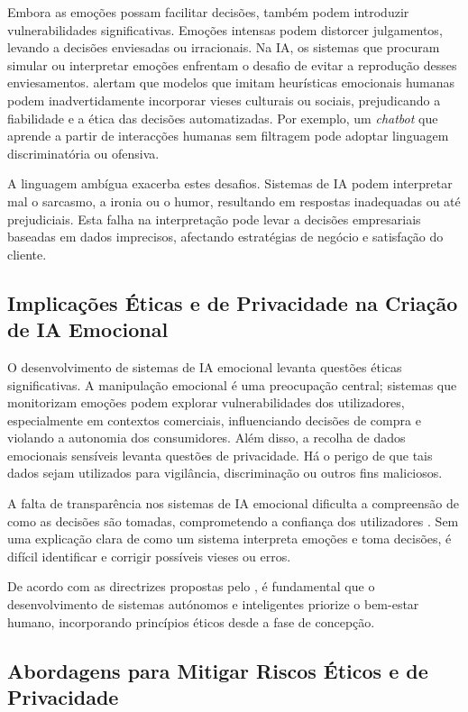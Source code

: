 \documentclass[a4paper,12pt]{report}
\begin{document}
	Embora as emoções possam facilitar decisões, também podem introduzir vulnerabilidades significativas. Emoções intensas podem distorcer julgamentos, levando a decisões enviesadas ou irracionais. Na IA, os sistemas que procuram simular ou interpretar emoções enfrentam o desafio de evitar a reprodução desses enviesamentos. \textcite{russell2020} alertam que modelos que imitam heurísticas emocionais humanas podem inadvertidamente incorporar vieses culturais ou sociais, prejudicando a fiabilidade e a ética das decisões automatizadas. Por exemplo, um \textit{chatbot} que aprende a partir de interacções humanas sem filtragem pode adoptar linguagem discriminatória ou ofensiva.
	
	A linguagem ambígua exacerba estes desafios. Sistemas de IA podem interpretar mal o sarcasmo, a ironia ou o humor, resultando em respostas inadequadas ou até prejudiciais. Esta falha na interpretação pode levar a decisões empresariais baseadas em dados imprecisos, afectando estratégias de negócio e satisfação do cliente.
	
	\subsection{Implicações Éticas e de Privacidade na Criação de IA Emocional}
	
	O desenvolvimento de sistemas de IA emocional levanta questões éticas significativas. A manipulação emocional é uma preocupação central; sistemas que monitorizam emoções podem explorar vulnerabilidades dos utilizadores, especialmente em contextos comerciais, influenciando decisões de compra e violando a autonomia dos consumidores. Além disso, a recolha de dados emocionais sensíveis levanta questões de privacidade. Há o perigo de que tais dados sejam utilizados para vigilância, discriminação ou outros fins maliciosos.
	
	A falta de transparência nos sistemas de IA emocional dificulta a compreensão de como as decisões são tomadas, comprometendo a confiança dos utilizadores \parencite{russell2020}. Sem uma explicação clara de como um sistema interpreta emoções e toma decisões, é difícil identificar e corrigir possíveis vieses ou erros.
	
	De acordo com as directrizes propostas pelo \textcite{ieee2019}, é fundamental que o desenvolvimento de sistemas autónomos e inteligentes priorize o bem-estar humano, incorporando princípios éticos desde a fase de concepção.
	
	\subsection{Abordagens para Mitigar Riscos Éticos e de Privacidade}
	
\end{document}
